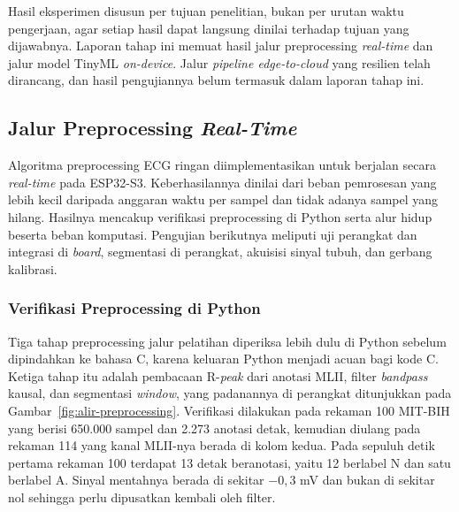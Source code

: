 Hasil eksperimen disusun per tujuan penelitian, bukan per urutan waktu pengerjaan, agar setiap hasil dapat langsung dinilai terhadap tujuan yang dijawabnya. Laporan tahap ini memuat hasil jalur preprocessing \textit{real-time} dan jalur model TinyML \textit{on-device}. Jalur \textit{pipeline edge-to-cloud} yang resilien telah dirancang, dan hasil pengujiannya belum termasuk dalam laporan tahap ini.

\subsection{Jalur Preprocessing \textit{Real-Time}}

Algoritma preprocessing ECG ringan diimplementasikan untuk berjalan secara \textit{real-time} pada ESP32-S3. Keberhasilannya dinilai dari beban pemrosesan yang lebih kecil daripada anggaran waktu per sampel dan tidak adanya sampel yang hilang. Hasilnya mencakup verifikasi preprocessing di Python serta alur hidup beserta beban komputasi. Pengujian berikutnya meliputi uji perangkat dan integrasi di \textit{board}, segmentasi di perangkat, akuisisi sinyal tubuh, dan gerbang kalibrasi.

\subsubsection{Verifikasi Preprocessing di Python}

Tiga tahap preprocessing jalur pelatihan diperiksa lebih dulu di Python sebelum dipindahkan ke bahasa C, karena keluaran Python menjadi acuan bagi kode C. Ketiga tahap itu adalah pembacaan R-\textit{peak} dari anotasi MLII, filter \textit{bandpass} kausal, dan segmentasi \textit{window}, yang padanannya di perangkat ditunjukkan pada Gambar~\ref{fig:alir-preprocessing}. Verifikasi dilakukan pada rekaman 100 MIT-BIH yang berisi 650.000 sampel dan 2.273 anotasi detak, kemudian diulang pada rekaman 114 yang kanal MLII-nya berada di kolom kedua. Pada sepuluh detik pertama rekaman 100 terdapat 13 detak beranotasi, yaitu 12 berlabel N dan satu berlabel A. Sinyal mentahnya berada di sekitar $-0{,}3$ mV dan bukan di sekitar nol sehingga perlu dipusatkan kembali oleh filter.

